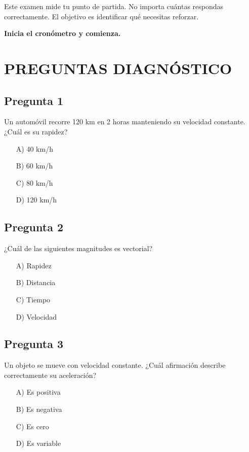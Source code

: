 Este examen mide tu punto de partida. No importa cuántas respondas correctamente. El objetivo es identificar qué necesitas reforzar.

\vspace{1cm}

\begin{tcolorbox}[colback=amarillonotа, colframe=orange, boxrule=0pt, leftrule=3pt]
\textbf{Inicia el cronómetro y comienza.}
\end{tcolorbox}

\newpage

\section{PREGUNTAS DIAGNÓSTICO}

\begin{preguntabox}
\subsection{Pregunta 1}
Un automóvil recorre 120 km en 2 horas manteniendo su velocidad constante. ¿Cuál es su rapidez?

\begin{enumerate}
    \item[A)] 40 km/h
    \item[B)] 60 km/h
    \item[C)] 80 km/h
    \item[D)] 120 km/h
\end{enumerate}
\end{preguntabox}

\begin{preguntabox}
\subsection{Pregunta 2}
¿Cuál de las siguientes magnitudes es vectorial?

\begin{enumerate}
    \item[A)] Rapidez
    \item[B)] Distancia
    \item[C)] Tiempo
    \item[D)] Velocidad
\end{enumerate}
\end{preguntabox}

\begin{preguntabox}
\subsection{Pregunta 3}
Un objeto se mueve con velocidad constante. ¿Cuál afirmación describe correctamente su aceleración?

\begin{enumerate}
    \item[A)] Es positiva
    \item[B)] Es negativa
    \item[C)] Es cero
    \item[D)] Es variable
\end{enumerate}
\end{preguntabox}

